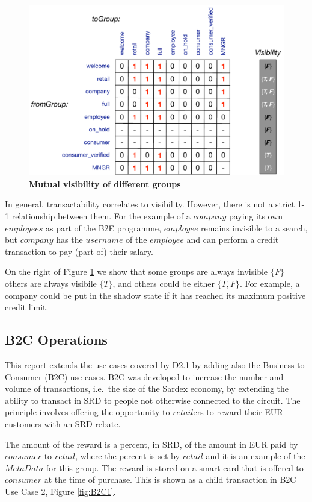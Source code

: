 \begin{figure}[H]
\centering
\includegraphics[width=12cm]{Figures/Visibility}
\caption{\small\textbf{Mutual visibility of different groups}}
\label{fig:visibility}
\end{figure}

In general, transactability correlates to visibility. However, there is not a strict 1-1 relationship between them. For the example of a $company$ paying its own $employees$ as part of the B2E programme, $employee$ remains invisible to a search, but $company$ has the $username$ of the $employee$ and can perform a credit transaction to pay (part of) their salary.

On the right of Figure \ref{fig:visibility} we show that some groups are always invisible $\{ F \}$ others are always visibile $\{ T \}$, and others could be either $\{T, F\}$. For example, a company could be put in the shadow state if it has reached its maximum positive credit limit.

\subsection{B2C Operations}
This report extends the use cases covered by D2.1 by adding also the Business to Consumer (B2C) use cases. B2C was developed to increase the number and volume of transactions, i.e.\ the size of the Sardex economy, by extending the ability to transact in SRD to people not otherwise connected to the circuit. The principle involves offering the opportunity to $retail$ers to reward their EUR customers with an SRD rebate.

The amount of the reward is a percent, in SRD, of the amount in EUR paid by $consumer$ to $retail$, where the percent is set by $retail$ and it is an example of the $MetaData$ for this group. The reward is stored on a smart card that is offered to $consumer$ at the time of purchase. This is shown as a child transaction in B2C Use Case 2, Figure \ref{fig:B2C1}.

